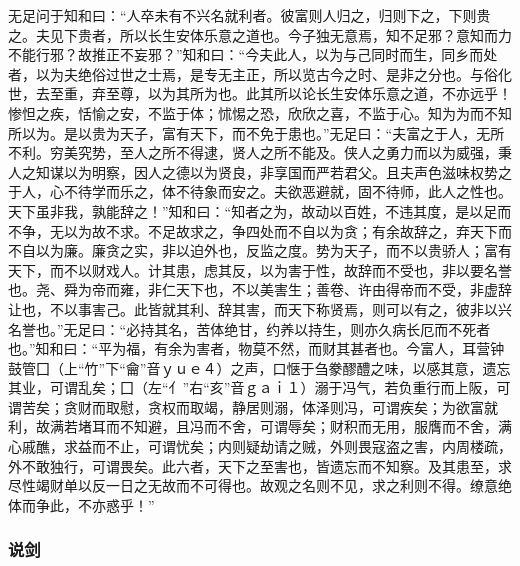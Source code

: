 \documentclass[]{article}
\begin{document}
无足问于知和曰：``人卒未有不兴名就利者。彼富则人归之，归则下之，下则贵之。夫见下贵者，所以长生安体乐意之道也。今子独无意焉，知不足邪？意知而力不能行邪？故推正不妄邪？''知和曰：``今夫此人，以为与己同时而生，同乡而处者，以为夫绝俗过世之士焉，是专无主正，所以览古今之时、是非之分也。与俗化世，去至重，弃至尊，以为其所为也。此其所以论长生安体乐意之道，不亦远乎！惨怛之疾，恬愉之安，不监于体；怵惕之恐，欣欣之喜，不监于心。知为为而不知所以为。是以贵为天子，富有天下，而不免于患也。''无足曰：``夫富之于人，无所不利。穷美究势，至人之所不得逮，贤人之所不能及。侠人之勇力而以为威强，秉人之知谋以为明察，因人之德以为贤良，非享国而严若君父。且夫声色滋味权势之于人，心不待学而乐之，体不待象而安之。夫欲恶避就，固不待师，此人之性也。天下虽非我，孰能辞之！''知和曰：``知者之为，故动以百姓，不违其度，是以足而不争，无以为故不求。不足故求之，争四处而不自以为贪；有余故辞之，弃天下而不自以为廉。廉贪之实，非以迫外也，反监之度。势为天子，而不以贵骄人；富有天下，而不以财戏人。计其患，虑其反，以为害于性，故辞而不受也，非以要名誉也。尧、舜为帝而雍，非仁天下也，不以美害生；善卷、许由得帝而不受，非虚辞让也，不以事害己。此皆就其利、辞其害，而天下称贤焉，则可以有之，彼非以兴名誉也。''无足曰：``必持其名，苦体绝甘，约养以持生，则亦久病长厄而不死者也。''知和曰：``平为福，有余为害者，物莫不然，而财其甚者也。今富人，耳营钟鼓管囗（上``竹''下``龠''音ｙｕｅ４）之声，口惬于刍豢醪醴之味，以感其意，遗忘其业，可谓乱矣；囗（左``亻''右``亥''音ｇａｉ１）溺于冯气，若负重行而上阪，可谓苦矣；贪财而取慰，贪权而取竭，静居则溺，体泽则冯，可谓疾矣；为欲富就利，故满若堵耳而不知避，且冯而不舍，可谓辱矣；财积而无用，服膺而不舍，满心戚醮，求益而不止，可谓忧矣；内则疑劫请之贼，外则畏寇盗之害，内周楼疏，外不敢独行，可谓畏矣。此六者，天下之至害也，皆遗忘而不知察。及其患至，求尽性竭财单以反一日之无故而不可得也。故观之名则不见，求之利则不得。缭意绝体而争此，不亦惑乎！''

\hypertarget{header-n485}{%
\subsubsection{说剑}\label{header-n485}}
\end{document}
